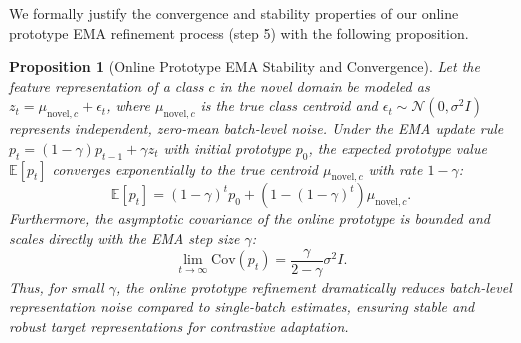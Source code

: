 \documentclass[twoside]{article}
\newtheorem{proposition}{Proposition}
\begin{document}
We formally justify the convergence and stability properties of our online prototype EMA refinement process (step 5) with the following proposition.

\begin{proposition}[Online Prototype EMA Stability and Convergence]
Let the feature representation of a class $c$ in the novel domain be modeled as $z_t = \mu_{\mathrm{novel},c} + \epsilon_t$, where $\mu_{\mathrm{novel},c}$ is the true class centroid and $\epsilon_t \sim \mathcal{N}(0, \sigma^2 I)$ represents independent, zero-mean batch-level noise. Under the EMA update rule $p_{t} = (1-\gamma)p_{t-1} + \gamma z_t$ with initial prototype $p_0$, the expected prototype value $\mathbb{E}[p_t]$ converges exponentially to the true centroid $\mu_{\mathrm{novel},c}$ with rate $1-\gamma$:
\begin{equation}
\mathbb{E}[p_t] = (1-\gamma)^t p_0 + \left(1 - (1-\gamma)^t\right) \mu_{\mathrm{novel},c}.
\end{equation}
Furthermore, the asymptotic covariance of the online prototype is bounded and scales directly with the EMA step size $\gamma$:
\begin{equation}
\lim_{t \to \infty} \mathrm{Cov}(p_t) = \frac{\gamma}{2-\gamma} \sigma^2 I.
\end{equation}
Thus, for small $\gamma$, the online prototype refinement dramatically reduces batch-level representation noise compared to single-batch estimates, ensuring stable and robust target representations for contrastive adaptation.
\end{proposition}
\end{document}

